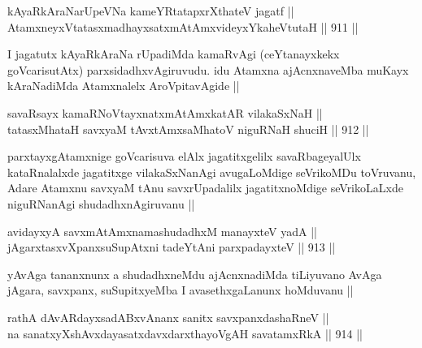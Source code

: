 
\begin{shl}
kAyaRkAraNarUpeVNa kameYRtatapxrXthateV jagatf ||  \\
AtamxneyxVtatasxmadhayxsatxmAtAmxvideyxYkaheVtutaH ||  911 ||  
\end{shl}

\begin{artha}
I jagatutx kAyaRkAraNa rUpadiMda kamaRvAgi (ceYtanayxkekx goVcarisutAtx) parxsidadhxvAgiruvudu. idu Atamxna ajAcnxnaveMba muKayx kAraNadiMda Atamxnalelx AroVpitavAgide ||
\end{artha}


\begin{shl}
savaRsayx kamaRNoV\s tayxnatxmAtAmx\s katAR vilakaSxNaH ||  \\
tatasxMhataH savxyaM tAvxtAmx\s saMhatoV niguRNaH shuciH ||  912 ||  
\end{shl}

\begin{artha}
parxtayxgAtamxnige goVcarisuva elAlx jagatitxgelilx savaRbageyalUlx kataRnalalxde jagatitxge vilakaSxNanAgi avugaLoMdige seVrikoMDu toVruvanu, Adare Atamxnu savxyaM tAnu savxrUpadalilx jagatitxnoMdige seVrikoLaLxde niguRNanAgi shudadhxnAgiruvanu ||
\end{artha}


\begin{shl}
avidayxyA savxmAtAmxnamashudadhxM manayxteV yadA || \\
jAgarxtasxvXpanxsuSupAtxni tadeYtAni parxpadayxteV ||  913 ||  
\end{shl}

\begin{artha}
yAvAga tananxnunx a shudadhxneMdu ajAcnxnadiMda tiLiyuvano AvAga jAgara, savxpanx, suSupitxyeMba I avasethxgaLanunx hoMduvanu ||
\end{artha}


\begin{shl}
rathA dAvARdayxsadABxvAnanx sanitx savxpanxdashaRneV || \\
na sanatxyXshAvxdayasatxdavxdarxthayoVgAH savatamxRkA ||  914 ||  
\end{shl}
				
